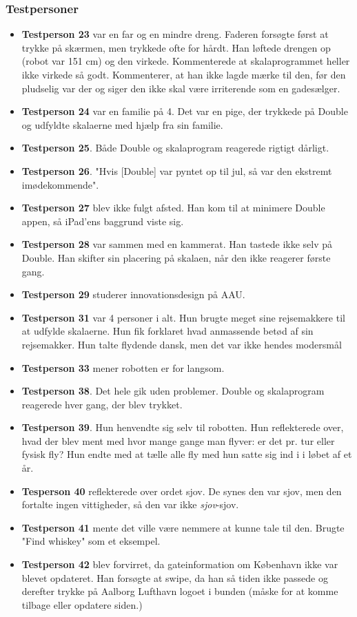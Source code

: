 \subsubsection{Testpersoner}
\begin{itemize}
\item \textbf{Testperson 23} var en far og en mindre dreng. Faderen forsøgte først at trykke på skærmen, men trykkede ofte for hårdt. Han løftede drengen op (robot var 151 cm) og den virkede. Kommenterede at skalaprogrammet heller ikke virkede så godt. Kommenterer, at han ikke lagde mærke til den, før den pludselig var der og siger den ikke skal være irriterende som en gadesælger.
\item \textbf{Testperson 24} var en familie på 4. Det var en pige, der trykkede på Double og udfyldte skalaerne med hjælp fra sin familie.
\item	\textbf{Testperson 25}. Både Double og skalaprogram reagerede rigtigt dårligt.
\item \textbf{Testperson 26}. "Hvis [Double] var pyntet op til jul, så var den ekstremt imødekommende".
\item \textbf{Testperson 27} blev ikke fulgt afsted. Han kom til at minimere Double appen, så iPad'ens baggrund viste sig.
\item \textbf{Testperson 28} var sammen med en kammerat. Han tastede ikke selv på Double. Han skifter sin placering på skalaen, når den ikke reagerer første gang.
\item \textbf{Testperson 29} studerer innovationsdesign på AAU.
\item	\textbf{Testperson 31} var 4 personer i alt. Hun brugte meget sine rejsemakkere til at udfylde skalaerne. Hun fik forklaret hvad anmassende betød af sin rejsemakker. Hun talte flydende dansk, men det var ikke hendes modersmål
\item \textbf{Testperson 33} mener robotten er for langsom.
\item \textbf{Testperson 38}. Det hele gik uden problemer. Double og skalaprogram reagerede hver gang, der blev trykket.
\item \textbf{Testperson 39}. Hun henvendte sig selv til robotten. Hun reflekterede over, hvad der blev ment med hvor mange gange man flyver: er det pr. tur eller fysisk fly? Hun endte med at tælle alle fly med hun satte sig ind i i løbet af et år.
\item \textbf{Tesperson 40} reflekterede over ordet sjov. De synes den var sjov, men den fortalte ingen vittigheder, så den var ikke \textit{sjov}-sjov.
\item \textbf{Testperson 41} mente det ville være nemmere at kunne tale til den. Brugte "Find whiskey" som et eksempel.
\item \textbf{Testperson 42} blev forvirret, da gateinformation om København ikke var blevet opdateret. Han forsøgte at swipe, da han så tiden ikke passede og derefter trykke på Aalborg Lufthavn logoet i bunden (måske for at komme tilbage eller opdatere siden.)


\end{itemize}